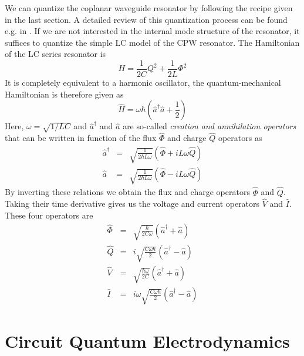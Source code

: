 We can quantize the coplanar waveguide resonator by following the recipe given in the last section. A detailed review of this quantization process can be found e.g. in \citep{yurke_quantum_1984}. If we are not interested in the internal mode structure of the resonator, it suffices to quantize the simple LC model of the CPW resonator. The Hamiltonian of the LC series resonator is
%
\begin{equation}
H = \frac{1}{2C}Q^2+\frac{1}{2L}\Phi^2
\end{equation}
%
It is completely equivalent to a harmonic oscillator, the quantum-mechanical Hamiltonian is therefore given as
%
\begin{equation}
\hat{H} = \omega\hbar\left(\hat{a}^\dagger\hat{a}+\frac{1}{2}\right)
\end{equation}
%
Here, $\omega=\sqrt{1/LC}$ and $\hat{a}^\dagger$ and $\hat{a}$ are so-called {\it creation and annihilation operators} that can be written in function of the flux $\hat{\Phi}$ and charge $\hat{Q}$ operators as
%
\begin{eqnarray}
\hat{a}^\dagger & = & \sqrt{\frac{1}{2\hbar L \omega}}\left(\hat{\Phi}+iL\omega \hat{Q}\right)\\
\hat{a} & = & \sqrt{\frac{1}{2\hbar L\omega}}\left( \hat{\Phi}-iL\omega \hat{Q}\right)
\end{eqnarray}
%
By inverting these relations we obtain the flux and charge operators $\hat{\Phi}$ and $\hat{Q}$. Taking their time derivative gives us the voltage and current operators $\hat{V}$ and $\hat{I}$. These four operators are
%
\begin{eqnarray}
\hat{\Phi} & = & \sqrt{\frac{\hbar}{2C\omega}}\left(\hat{a}^\dagger+\hat{a}\right) \\
\hat{Q} & = & i\sqrt{\frac{C\omega\hbar}{2}}\left(\hat{a}^\dagger-\hat{a}\right) \\
\hat{V} & = & \sqrt{\frac{\hbar\omega}{2C}}\left(\hat{a}^\dagger+\hat{a}\right) \\
\hat{I} & = & i\omega\sqrt{\frac{C\omega\hbar}{2}}\left(\hat{a}^\dagger-\hat{a}\right)
\end{eqnarray}
%

\section{Circuit Quantum Electrodynamics}

